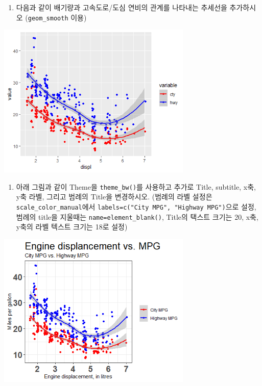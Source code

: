 \documentclass[
]{book}
\providecommand{\tightlist}{%
  \setlength{\itemsep}{0pt}\setlength{\parskip}{0pt}}
\begin{document}
\begin{enumerate}
\def\labelenumi{\arabic{enumi})}
\setcounter{enumi}{3}
\tightlist
\item
  다음과 같이 배기량과 고속도로/도심 연비의 관계를 나타내는 추세선을 추가하시오 (\texttt{geom\_smooth} 이용)
\end{enumerate}

\includegraphics[width=3.64583in,height=\textheight]{images/06/ex6-4-4.png}

\begin{enumerate}
\def\labelenumi{\arabic{enumi})}
\setcounter{enumi}{4}
\tightlist
\item
  아래 그림과 같이 Theme을 \texttt{theme\_bw()}를 사용하고 추가로 Title, subtitle, x축, y축 라벨, 그리고 범례의 Title을 변경하시오. (범례의 라벨 설정은 \texttt{scale\_color\_manual}에서 \texttt{labels=c("City\ MPG",\ "Highway\ MPG")}으로 설정, 범례의 title을 지울때는 \texttt{name=element\_blank()}, Title의 택스트 크기는 20, x축, y축의 라벨 텍스트 크기는 18로 설정)
\end{enumerate}

\includegraphics[width=3.64583in,height=\textheight]{images/06/ex6-4-5.png}
\end{document}
